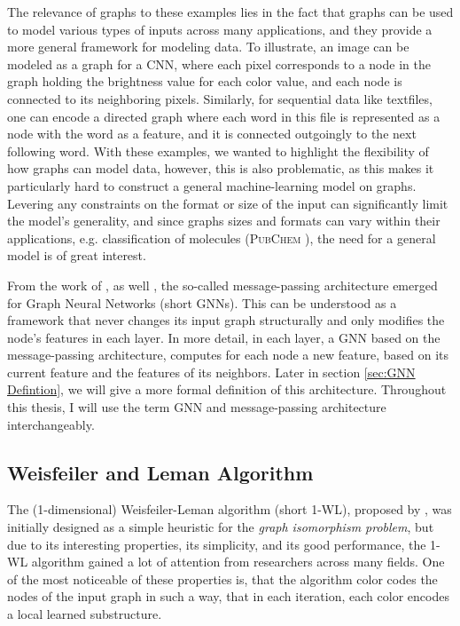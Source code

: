 \documentclass[11pt, dvipsnames, DIV=12]{scrreprt}
\theoremstyle{definition}
\begin{document}
The relevance of graphs to these examples lies in the fact that graphs can be used to model various types of inputs across many applications, and they provide a more general framework for modeling data. To illustrate, an image can be modeled as a graph for a CNN, where each pixel corresponds to a node in the graph holding the brightness value for each color value, and each node is connected to its neighboring pixels. Similarly, for sequential data like textfiles, one can encode a directed graph where each word in this file is represented as a node with the word as a feature, and it is connected outgoingly to the next following word. With these examples, we wanted to highlight the flexibility of how graphs can model data, however, this is also problematic, as this makes it particularly hard to construct a general machine-learning model on graphs. Levering any constraints on the format or size of the input can significantly limit the model's generality, and since graphs sizes and formats can vary within their applications, e.g. classification of molecules (\textsc{PubChem} \cite{Mor+2020}), the need for a general model is of great interest.

From the work of \cite{Gil+2017}, as well \cite{Sca+2009}, the so-called message-passing architecture emerged for Graph Neural Networks (short GNNs). This can be understood as a framework that never changes its input graph structurally and only modifies the node's features in each layer. In more detail, in each layer, a GNN based on the message-passing architecture, computes for each node a new feature, based on its current feature and the features of its neighbors. Later in section \ref{sec:GNN Defintion}, we will give a more formal definition of this architecture.
Throughout this thesis, I will use the term GNN and message-passing architecture interchangeably.


\subsection{Weisfeiler and Leman Algorithm}
The (1-dimensional) Weisfeiler-Leman algorithm (short 1-WL), proposed by \cite{Wei+1968}, was initially designed as a simple heuristic for the \textit{graph isomorphism problem}, but due to its interesting properties, its simplicity, and its good performance, the 1-WL algorithm gained a lot of attention from researchers across many fields. One of the most noticeable of these properties is, that the algorithm color codes the nodes of the input graph in such a way, that in each iteration, each color encodes a local learned substructure.
\end{document}
